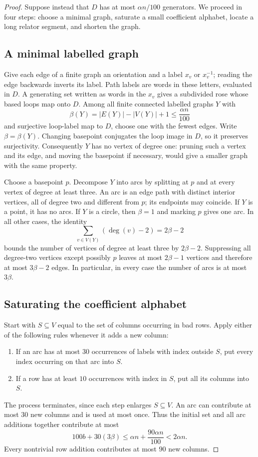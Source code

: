 \begin{proof}
Suppose instead that $D$ has at most $\alpha n/100$ generators.
We proceed in four steps: choose a minimal graph, saturate a small
coefficient alphabet, locate a long relator segment, and shorten the graph.

\subsection*{A minimal labelled graph}
Give each edge of a finite graph an orientation and a label $x_v$ or
$x_v^{-1}$; reading the edge backwards inverts its label.  Path labels
are words in these letters, evaluated in $D$.  A generating set written
as words in the $x_v$ gives a subdivided rose whose based loops map onto
$D$.  Among all finite connected labelled graphs $Y$ with
\[
 \beta(Y)=|E(Y)|-|V(Y)|+1\le\frac{\alpha n}{100}
\]
and surjective loop-label map to $D$, choose one with the fewest edges.
Write $\beta=\beta(Y)$.  Changing basepoint conjugates the loop image in
$D$, so it preserves surjectivity.  Consequently $Y$ has no vertex of
degree one: pruning such a vertex and its edge, and moving the basepoint
if necessary, would give a smaller graph with the same property.

Choose a basepoint $p$.  Decompose $Y$ into arcs by splitting at $p$ and
at every vertex of degree at least three.  An arc is an edge path with
distinct interior vertices, all of degree two and different from $p$;
its endpoints may coincide.  If $Y$ is a point, it has no arcs.  If $Y$
is a circle, then $\beta=1$ and marking $p$ gives one arc.  In all other
cases, the identity
\[
 \sum_{v\in V(Y)}(\deg(v)-2)=2\beta-2
\]
bounds the number of vertices of degree at least three by $2\beta-2$.
Suppressing all degree-two vertices except possibly $p$ leaves at most
$2\beta-1$ vertices and therefore at most $3\beta-2$ edges.
In particular, in every case the number of arcs is at most $3\beta$.

\subsection*{Saturating the coefficient alphabet}
Start with $S\subseteq V$ equal to the set of columns occurring in bad
rows.  Apply either of the following rules whenever it adds a new column:
\begin{enumerate}
\item If an arc has at most $30$ occurrences of labels with index
outside $S$, put every index occurring on that arc into $S$.
\item If a row has at least $10$ occurrences with index in $S$, put
all its columns into $S$.
\end{enumerate}
The process terminates, since each step enlarges $S\subseteq V$.
An arc can contribute at most $30$ new columns and is used at most once.
Thus the initial set and all arc additions together contribute at most
\begin{equation}\label{rank:seed}
 100b+30(3\beta)
 \le\alpha n+\frac{90\alpha n}{100}<2\alpha n.
\end{equation}
Every nontrivial row addition contributes at most $90$ new columns.


\end{proof}
